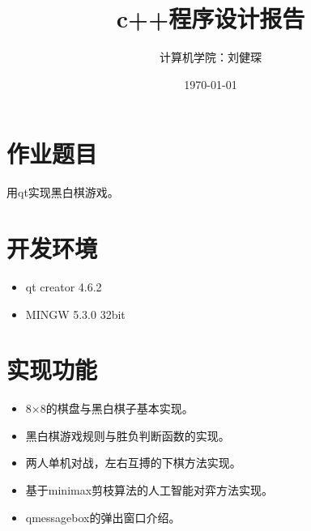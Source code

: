 \documentclass[UTF8]{ctexart}
\title{c++程序设计报告}
\author{计算机学院：刘健琛}
\date{\today}
\begin{document}
\maketitle
\tableofcontents
\section{作业题目}
用qt实现黑白棋游戏。
\section{开发环境}
\begin{itemize}
    \item qt creator 4.6.2
\end{itemize}
\begin{itemize}
    \item MINGW 5.3.0 32bit
\end{itemize}

\section{实现功能}
\begin{itemize}
    \item 8×8的棋盘与黑白棋子基本实现。
\end{itemize}
\begin{itemize}
    \item 黑白棋游戏规则与胜负判断函数的实现。
\end{itemize}
\begin{itemize}
    \item 两人单机对战，左右互搏的下棋方法实现。
\end{itemize}
\begin{itemize}
    \item 基于minimax剪枝算法的人工智能对弈方法实现。
\end{itemize}
\begin{itemize}
    \item qmessagebox的弹出窗口介绍。
\end{itemize}
\end{document}
